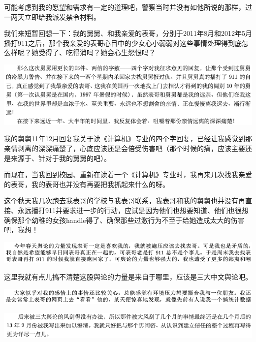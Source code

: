 \documentclass[9pt, b5paper]{article}
\begin{document}
可能考虑到我的愿望和需求有一定的道理吧，警察当时并没有如他所说的那样，过一两天立即给我派发禁令材料。

我们来短暂回想一下：我的舅舅、和我亲爱的表哥，分别于2011年8月和2012年5月播打911之后，那个我亲爱的表哥心目中的少女心小弱弱对这些事情处理得到底怎么样呢？她受得了、吃得消吗？她会心生怨恨吗？

\begin{center}
\includegraphics[width=.9\linewidth]{./pic/backups_plans_20210506_101409.png}
\end{center}

我的舅舅11年12月回复我关于读《计算机》专业的四个字回复，已经让我感觉到那亲情剥离的深深痛楚了，心底应该还是会倍受伤害吧（那个时候的痛，应该主要还是来源于、针对于我的舅舅的吧）。

而现在，当我回到校园、重新在读着一个《计算机》专业时，我再来几次找我亲爱的表哥，我的表哥也并没有再要把我抓起来什么的呀。

这个秋天我几次跑去我表哥的学校与我表哥联系，我表哥和我的舅舅也并没有再直接、永远播打911并要求进一步的行动，应试是因为他们也想要知道、他们也很想确保那个幼稚的女孩handle得了、确保那些过激行为不至于给她造成太大的伤害吧，我想！

\begin{center}
\includegraphics[width=.9\linewidth]{./pic/backups_plans_20210505_205552.png}
\end{center}

这里我就有点儿搞不清楚这股舆论的力量是来自于哪里，应该是三大中文舆论吧。

\begin{center}
\includegraphics[width=.9\linewidth]{./pic/backups_plans_20210506_112740.png}
\end{center}

\begin{center}
\includegraphics[width=.9\linewidth]{./pic/backups_plans_20210506_112956.png}
\end{center}
\end{document}
